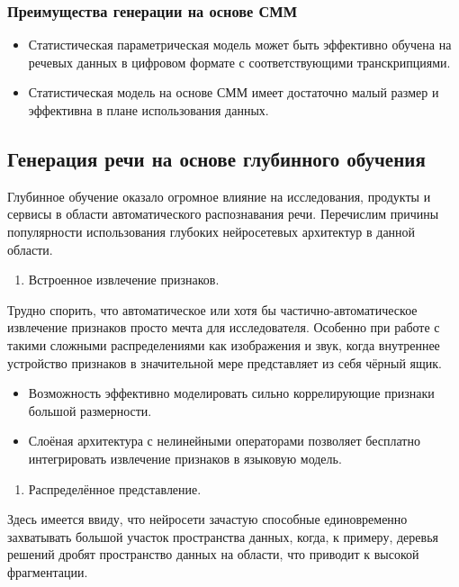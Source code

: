 \documentclass[../diploma.tex]{subfiles}
\begin{document}
\subsubsection{Преимущества генерации на основе СММ}
\begin{itemize}
    \item Статистическая параметрическая модель может быть эффективно обучена на речевых данных в цифровом формате с соответствующими транскрипциями.
    \item Статистическая модель на основе СММ имеет достаточно малый размер и эффективна в плане использования данных.
\end{itemize}

\subsection{Генерация речи на основе глубинного обучения}
    
    Глубинное обучение оказало огромное влияние на исследования, продукты и сервисы в области  автоматического распознавания речи. Перечислим причины популярности использования глубоких нейросетевых архитектур в данной области.
    
    \begin{enumerate}
        \item Встроенное извлечение признаков.
    \end{enumerate}    
    
    Трудно спорить, что автоматическое или хотя бы частично-автоматическое извлечение признаков просто мечта для исследователя. Особенно при работе с такими сложными распределениями как изображения и звук, когда внутреннее устройство признаков в значительной мере представляет из себя чёрный ящик.
    
        \begin{itemize}
            \item Возможность эффективно моделировать сильно коррелирующие признаки большой размерности. 
            \item Слоёная архитектура с нелинейными операторами позволяет бесплатно интегрировать извлечение признаков в языковую модель.
        \end{itemize}    
    
    \begin{enumerate}[resume]
        \item Распределённое представление.
    \end{enumerate}    
        Здесь имеется ввиду, что нейросети зачастую способные единовременно захватывать большой участок пространства данных, когда, к примеру, деревья решений дробят пространство данных на области, что приводит к высокой фрагментации. 
    
\end{document}
